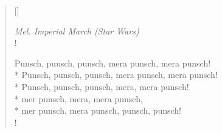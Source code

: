 
\settowidth{\versewidth}{Punsch, punsch, punsch, mera punsch, mera punsch!}



\begin{verse}[\versewidth]

\flagverse{}
\emph{Mel. Imperial March (Star Wars)}\\!


\flagverse{}
Punsch, punsch, punsch, mera punsch, mera punsch!\\* 
Punsch, punsch, punsch, mera punsch, mera punsch!\\*
Punsch, punsch, punsch, mera, mera punsch!\\*
mer punsch, mera, mera punsch,\\*
mer punsch, mera punsch, punsch, punsch!\\!




\end{verse}

